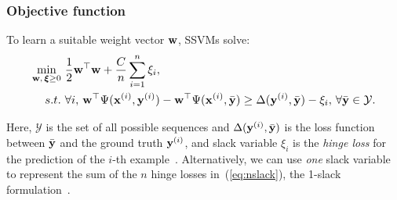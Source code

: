 \subsubsection{Objective function}
To learn a suitable weight vector $\mathbf{w}$, SSVMs solve: %
\begin{equation}
\label{eq:nslack}
\resizebox{0.909\linewidth}{!}{$\displaystyle
\begin{aligned}
\min_{\w, \, \bm{\xi} \ge 0} \ & \frac{1}{2} \w^\top \w + \frac{C}{n} \sum_{i=1}^n \xi_i, \\
s.t. \ & \forall i, \, 
  \w^\top \Psi(\x^{(i)}, \y^{(i)}) - \w^\top \Psi(\x^{(i)}, \bar{\y}) \ge
  \Delta(\y^{(i)}, \bar{\y}) - \xi_i, \, \forall \bar\y \in \mathcal{Y}.
\end{aligned}
$} \eqmoveup
\end{equation}

Here,
$\mathcal{Y}$ is the set of all possible sequences
and $\Delta(\mathbf{y}^{({i})}, \bar{\mathbf{y}})$ is the loss function between $\bar{\mathbf{y}}$ and the ground truth $\mathbf{y}^{({i})}$,
and slack variable $\xi_i$ is the \emph{hinge loss} for the prediction of the $i$-th example~\cite{tsochantaridis2005large}.
Alternatively, we can use \emph{one} slack variable to represent the sum of the $n$ hinge losses in~(\ref{eq:nslack}),
\ie the 1-slack formulation~\cite{tsochantaridis2005large}.



